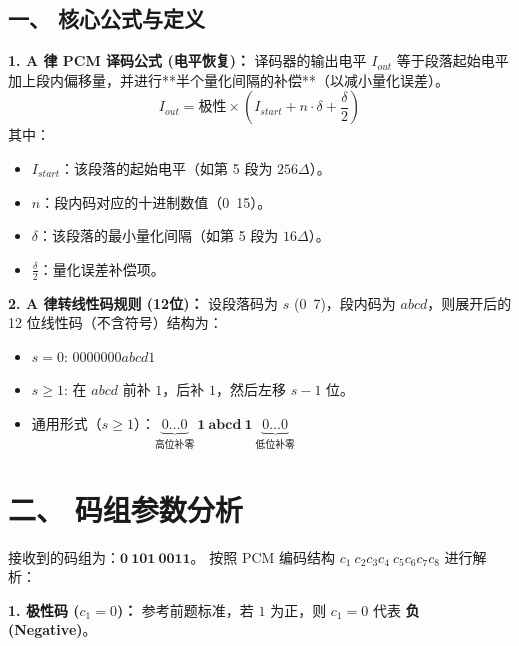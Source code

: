 \documentclass[a4paper,11pt]{ctexart}
\begin{document}
\begin{tcolorbox}[colback=white, colframe=blue!50!black, title=\textbf{题目解答：10-11 A 律 13 折线 PCM 译码计算}]

    \section*{一、 核心公式与定义}
    
    \textbf{1. A 律 PCM 译码公式 (电平恢复)：}
    译码器的输出电平 $I_{out}$ 等于段落起始电平加上段内偏移量，并进行**半个量化间隔的补偿**（以减小量化误差）。
    \begin{equation}
        I_{out} = \text{极性} \times \left( I_{start} + n \cdot \delta + \frac{\delta}{2} \right)
    \end{equation}
    其中：
    \begin{itemize}
        \item $I_{start}$：该段落的起始电平（如第 5 段为 $256\Delta$）。
        \item $n$：段内码对应的十进制数值（0~15）。
        \item $\delta$：该段落的最小量化间隔（如第 5 段为 $16\Delta$）。
        \item $\frac{\delta}{2}$：量化误差补偿项。
    \end{itemize}
    
    \textbf{2. A 律转线性码规则 (12位)：}
    设段落码为 $s$ (0~7)，段内码为 $abcd$，则展开后的 12 位线性码（不含符号）结构为：
    \begin{itemize}
        \item $s=0$: $0000000abcd1$
        \item $s \ge 1$: 在 $abcd$ 前补 $1$，后补 $1$，然后左移 $s-1$ 位。
        \item 通用形式（$s \ge 1$）：$\underbrace{0 \dots 0}_{\text{高位补零}} \ \mathbf{1} \ \mathbf{abcd} \ \mathbf{1} \ \underbrace{0 \dots 0}_{\text{低位补零}}$
    \end{itemize}

    \end{tcolorbox}

    \section*{二、 码组参数分析}
    
    接收到的码组为：$\mathbf{0 \ 101 \ 0011}$。
    按照 PCM 编码结构 $c_1 \ c_2 c_3 c_4 \ c_5 c_6 c_7 c_8$ 进行解析：
    
    \textbf{1. 极性码 ($c_1=0$)：}
    参考前题标准，若 $1$ 为正，则 $c_1=0$ 代表 \textbf{负 (Negative)}。
    
\end{document}
